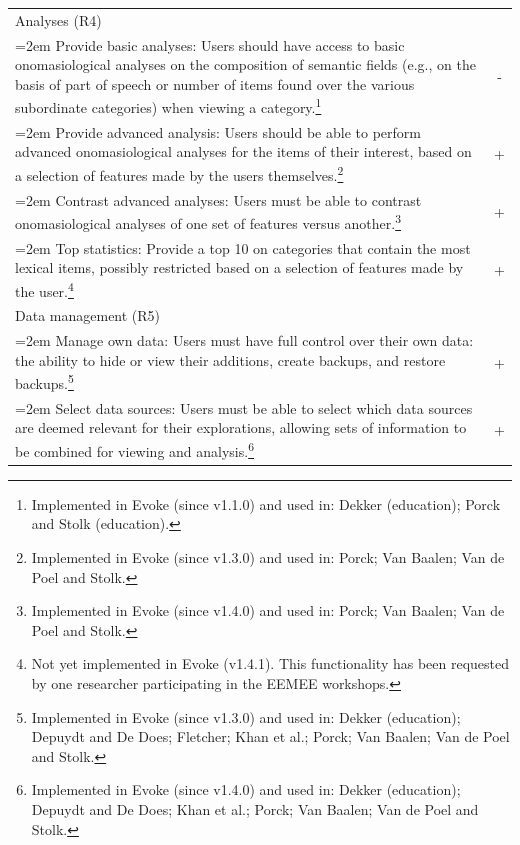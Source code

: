\begin{longtable}[h!]{>{\raggedright\small}p{4.5in}c}
\rowcolor{lightgray!50!}Analyses (R4) &\\
	
    \hangindent=2em
	Provide basic analyses: \linebreak
	Users should have access to basic onomasiological analyses on the composition of semantic fields (e.g., on the basis of part of speech or number of items found over the various subordinate categories) when viewing a category.\footnote{Implemented in Evoke (since v1.1.0) and used in: Dekker (education); Porck and Stolk (education).} & - \\
	
	\hangindent=2em
	Provide advanced analysis: \linebreak
	Users should be able to perform advanced onomasiological analyses for the items of their interest, based on a selection of features made by the users themselves.\footnote{Implemented in Evoke (since v1.3.0) and used in: Porck; Van Baalen; Van de Poel and Stolk.} & + \\
	
	\hangindent=2em
	Contrast advanced analyses: \linebreak
	Users must be able to contrast onomasiological analyses of one set of features versus another.\footnote{Implemented in Evoke (since v1.4.0) and used in: Porck; Van Baalen; Van de Poel and Stolk.} & + \\

    \hangindent=2em
    Top statistics: \linebreak 
    Provide a top 10 on categories that contain the most lexical items, possibly restricted based on a selection of features made by the user.\footnote{Not yet implemented in Evoke (v1.4.1). This functionality has been requested by one researcher participating in the EEMEE workshops.} & + \\

\rowcolor{lightgray!50!}Data management (R5) &\\

    \hangindent=2em
    Manage own data: \linebreak
    Users must have full control over their own data: the ability to hide or view their additions, create backups, and restore backups.\footnote{Implemented in Evoke (since v1.3.0) and used in: Dekker (education); Depuydt and De Does; Fletcher; Khan et al.; Porck; Van Baalen; Van de Poel and Stolk.} & + \\

    \hangindent=2em
    Select data sources: \linebreak
    Users must be able to select which data sources are deemed relevant for their explorations, allowing sets of information to be combined for viewing and analysis.\footnote{Implemented in Evoke (since v1.4.0) and used in: Dekker (education); Depuydt and De Does; Khan et al.; Porck; Van Baalen; Van de Poel and Stolk.} & + \\


\end{longtable}
